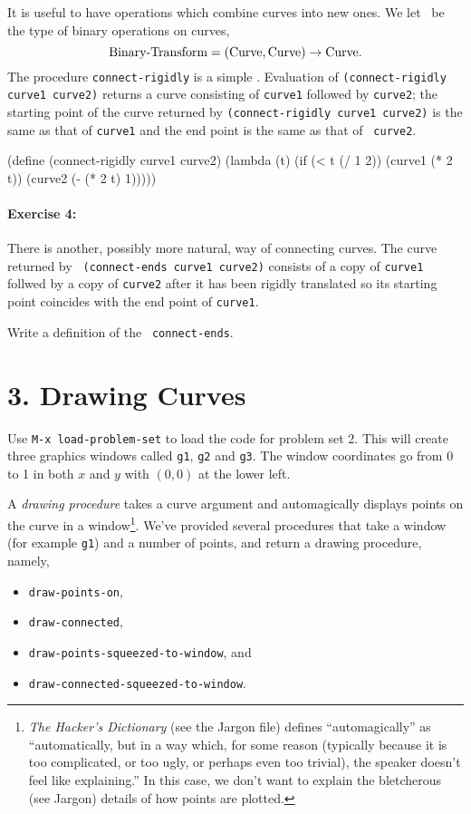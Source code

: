 It is useful to have operations which combine curves into new ones.  We
let \BT\ be the type of binary operations on curves, \[\mbox{Binary-Transform} =
(\mbox{Curve},\mbox{Curve})\rightarrow \mbox{Curve}.\] The procedure {\tt connect-rigidly} is a simple
\BT.  Evaluation of {\tt (connect-rigidly curve1 curve2)} returns a curve
consisting of {\tt curve1} followed by {\tt curve2}; the starting point of
the curve returned by {\tt (connect-rigidly curve1 curve2)} is the same as
that of {\tt curve1} and the end point is the same as that of {\tt
curve2}.

\beginlisp
(define (connect-rigidly curve1 curve2)
  (lambda (t) 
    (if (< t (/ 1 2))
        (curve1 (* 2 t))
        (curve2 (- (* 2 t) 1)))))
\endlisp

\paragraph{Exercise 4:} There is another, possibly more
natural, way of connecting curves.  The curve returned by {\tt
(connect-ends curve1 curve2)} consists of a copy of {\tt curve1}
follwed by a copy of {\tt curve2} after it has been rigidly translated
so its starting point coincides with the end point of {\tt curve1}.

Write a definition of the \BT\ {\tt connect-ends}.

\section{3. Drawing Curves}

Use {\tt M-x load-problem-set} to load the code for problem set 2.  This
will create three graphics windows called {\tt g1}, {\tt g2} and {\tt g3}.
The window coordinates go from 0 to 1 in both $x$ and $y$ with $(0,0)$ at
the lower left.

A {\em drawing procedure} takes a curve argument and automagically
displays points on the curve in a window\footnote{{\em The Hacker's
Dictionary} (see the Jargon file) defines ``automagically'' as
``automatically, but in a way which, for some reason (typically because it
is too complicated, or too ugly, or perhaps even too trivial), the speaker
doesn't feel like explaining.''  In this case, we don't want to explain
the bletcherous (see Jargon) details of how points are plotted.}.  We've
provided several procedures that take a window (for example {\tt g1}) and
a number of points, and return a drawing procedure, namely,
\begin{itemize}
\item {\tt draw-points-on},
\item {\tt draw-connected},
\item {\tt draw-points-squeezed-to-window}, and
\item {\tt draw-connected-squeezed-to-window}.
\end{itemize}

